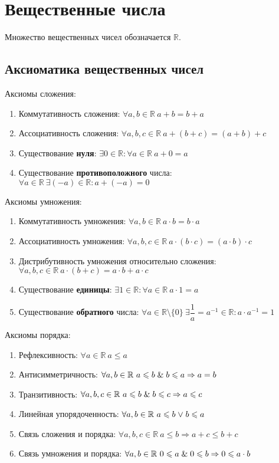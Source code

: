 \section{Вещественные числа}
  Множество вещественных чисел обозначается $\mathbb R$.

\subsection{Аксиоматика вещественных чисел}
Аксиомы сложения:
\begin{enumerate}
	\item Коммутативность сложения: $\forall a, b \in \mathbb R \ a + b = b + a$
	\item Ассоциативность сложения: $\forall a, b, c \in \mathbb R \ a + (b + c) = (a + b) + c$
	\item Существование \textbf{нуля}: $\exists 0 \in \mathbb R \colon \forall a \in \mathbb R \ a + 0 = a$
	\item Существование \textbf{противоположного} числа: $\forall a \in \mathbb R \ \exists (-a) \in \mathbb R \colon a + (-a) = 0$
\end{enumerate}

Аксиомы умножения:
\begin{enumerate}
	\item Коммутативность умножения: $\forall a, b \in \mathbb R \ a \cdot b = b \cdot a$
	\item Ассоциативность умножения: $\forall a, b, c \in \mathbb R \ a \cdot (b \cdot c) = (a \cdot b) \cdot c$
	\item Дистрибутивность умножения относительно сложения: $\forall a, b, c \in \mathbb R \ a \cdot (b + c) = a \cdot b + a \cdot c$
	\item Существование \textbf{единицы}: $\exists 1 \in \mathbb R \colon \forall a \in \mathbb R \ a \cdot 1 = a$
	\item Существование \textbf{обратного} числа: $\forall a \in \mathbb R \setminus \{ 0 \} \ \exists \dfrac1a = a^{-1} \in \mathbb R \colon a \cdot a^{-1} = 1$
\end{enumerate}

Аксиомы порядка:
\begin{enumerate}
	\item Рефлексивность: $\forall a \in \mathbb R \ a \leqslant a$
	\item Антисимметричность: $\forall a, b \in \mathbb R \ a \leqslant b \mathrel{\&} b \leqslant a \Rightarrow a = b$
	\item Транзитивность: $\forall a, b, c \in \mathbb R \ a \leqslant b \mathrel{\&} b \leqslant c \Rightarrow a \leqslant c$
	\item Линейная упорядоченность: $\forall a, b \in \mathbb R \ a \leqslant b \mathrel{\lor} b \leqslant a$
	\item Связь сложения и порядка: $\forall a, b, c \in \mathbb R \ a \leqslant b \Rightarrow a + c \leqslant b + c$
	\item Связь умножения и порядка: $\forall a, b \in \mathbb R \ 0 \leqslant a \mathrel{\&} 0 \leqslant b \Rightarrow 0 \leqslant a \cdot b$
\end{enumerate}

